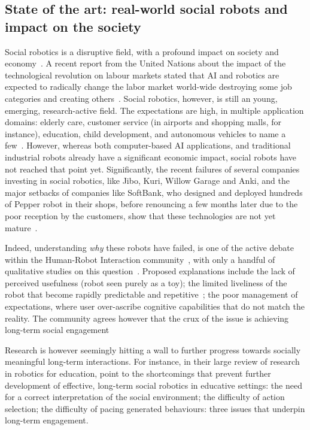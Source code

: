 \subsection{State of the art: real-world social robots and impact on the
society}

Social robotics is a disruptive field, with a profound impact on society and
economy~\parencite{williams2020social}. A recent report from the United Nations about
the impact of the technological revolution on labour markets stated that AI and
robotics are expected to radically change the labor market world-wide destroying
some job categories and creating others~\parencite{bruckner2017frontier}. Social
robotics, however, is still an young, emerging, research-active field. The
expectations are high, in multiple application domains: elderly care, customer
service (in airports and shopping malls, for instance), education, child
development, and autonomous vehicles to name a few~\parencite{baillie2019challenges}.
However, whereas both computer-based AI applications, and traditional industrial
robots already have a significant economic impact, social robots have not
reached that point yet. Significantly, the recent failures of several companies
investing in social robotics, like Jibo, Kuri, Willow Garage and Anki, and the
major setbacks of companies like SoftBank, who designed and deployed hundreds of
Pepper robot in their shops, before renouncing a few months later due to the poor
reception by the customers, show that these technologies are not yet
mature~\parencite{tulli2019great}.

Indeed, understanding \emph{why} these robots have failed, is one of the
active debate within the Human-Robot Interaction
community~\parencite{hoffman2019anki}, with only a handful of qualitative studies on
this question~\parencite{dereshev2019longterm,degraaf2017phased}. Proposed
explanations include the lack of perceived usefulness (robot seen purely as a
toy); the limited liveliness of the robot that become rapidly predictable and
repetitive~\parencite{lemaignan2014cognitive}; the poor management of expectations,
where user over-ascribe cognitive capabilities that do not match the reality.
The community agrees however that the crux of the issue is achieving long-term
social engagement~\parencite{yang2018grand,hoffman2019anki}

Research is however seemingly hitting a wall to further progress towards
socially meaningful long-term interactions. For instance, in their large review
of research in robotics for education, \textcite{belpaeme2018social}
point to the shortcomings that prevent further development of effective,
long-term social robotics in educative settings: the need for a correct
interpretation of the social environment; the difficulty of action selection;
the difficulty of pacing generated behaviours: three issues that underpin
long-term engagement.


